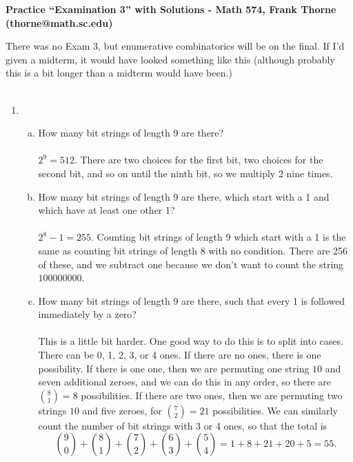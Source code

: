 \documentclass[12pt]{article}
\begin{document}
\setlength{\topmargin}{-12mm}






\begin{center}{\bf Practice ``Examination 3'' with Solutions - Math 574, Frank Thorne (thorne@math.sc.edu)}
\end{center}

There was no Exam 3, but enumerative combinatorics will be on the final. If I'd given a midterm,
it would have looked something like this (although probably this is a bit longer than a midterm would have been.)
\\
\\
\begin{enumerate}[1.]
\item
\begin{enumerate}[(a)]
\item
How many bit strings of length 9 are there?
\\
\\
$2^9 = 512$. There are two choices for the first bit, two choices for the second bit, and so on until the ninth
bit, so we multiply 2 nine times.
\item
How many bit strings of length 9 are there, which start with a 1 and which have at least one other 1?
\\
\\
$2^8 - 1 = 255$. Counting bit strings of length 9 which start with a 1 is the same as counting bit strings of length
8 with no condition. There are 256 of these, and we subtract one because we don't want to count the string $100000000$.

\item
How many bit strings of length 9 are there, such that every 1 is followed immediately by a zero?
\\
\\
This is a little bit harder. One good way to do this is to split into cases. There can be 0, 1, 2, 3, or 4 ones.
If there are no ones, there is one possibility. If there is one one, then we are permuting one string $10$ and seven
additional zeroes, and we can do this in any order, so there are ${8 \choose 1} = 8$ possibilities. If there are two
ones, then we are permuting two strings $10$ and five zeroes, for ${7 \choose 2} = 21$ possibilities. We can similarly
count the number of bit strings with 3 or 4 ones, so that the total is
$${9 \choose 0} + {8 \choose 1} + {7 \choose 2} + {6 \choose 3} + {5 \choose 4} = 1 + 8 + 21 + 20 + 5 = 55.$$


\end{enumerate}
\end{enumerate}
\end{document}
